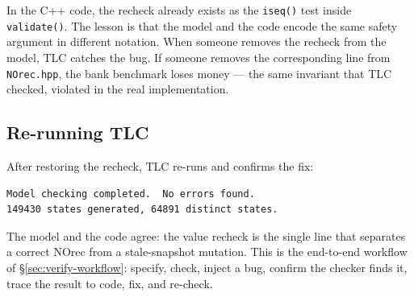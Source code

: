In the C++ code, the recheck already exists as the \texttt{iseq()} test
inside \texttt{validate()}.  The lesson is that the model and the code
encode the same safety argument in different notation.  When someone
removes the recheck from the model, TLC catches the bug.  If someone
removes the corresponding line from \texttt{NOrec.hpp}, the bank
benchmark loses money --- the same invariant that TLC checked, violated
in the real implementation.

\subsection{Re-running TLC}

After restoring the recheck, TLC re-runs and confirms the fix:

\begin{lstlisting}[caption={TLC output after the fix is restored.}]
Model checking completed.  No errors found.
149430 states generated, 64891 distinct states.
\end{lstlisting}

The model and the code agree: the value recheck is the single line
that separates a correct NOrec from a stale-snapshot mutation.  This is
the end-to-end workflow of \S\ref{sec:verify-workflow}: specify, check,
inject a bug, confirm the checker finds it, trace the result to code,
fix, and re-check.
